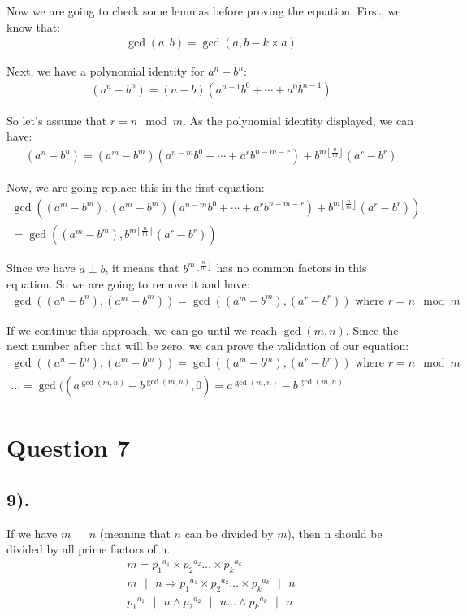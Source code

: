 \documentclass[12pt]{article}
\begin{document}
Now we are going to check some lemmas before proving the equation. First, we know that:
\begin{gather*}
    \gcd(a, b) = \gcd(a, b - k \times a)
\end{gather*}

Next, we have a polynomial identity for $a^n - b^n$:
\begin{gather*}
    (a^n - b^n) = (a - b)(a^{n-1}b^0 + \cdots + a^0b^{n-1})
\end{gather*}

So let's assume that $r = n \mod m$. As the polynomial identity displayed, we can have:
\begin{gather*}
    (a^n - b^n) = (a^m - b^m)(a^{n-m}b^0 + \cdots + a^r b^{n-m-r}) + b^{m \left\lfloor \frac{n}{m} \right\rfloor} (a^r - b^r)
\end{gather*}

Now, we are going replace this in the first equation:
\begin{gather*}
    \gcd((a^m - b^m), (a^m - b^m)(a^{n-m}b^0 + \cdots + a^r b^{n-m-r}) + b^{m \left\lfloor \frac{n}{m} \right\rfloor} (a^r - b^r)) \\
    = \gcd((a^m - b^m), b^{m \left\lfloor \frac{n}{m} \right\rfloor} (a^r - b^r))
\end{gather*}

Since we have $a \perp b$, it means that $b^{m \left\lfloor \frac{n}{m} \right\rfloor}$ has no common factors in this equation.
So we are going to remove it and have:
\begin{gather*}
    \gcd((a^n - b^n), (a^m - b^m)) = \gcd((a^m - b^m), (a^r - b^r)) \text{ where $r = n \mod m$}
\end{gather*}

If we continue this approach, we can go until we reach $\gcd(m,n)$. Since the next number after that will
be zero, we can prove the validation of our equation:
\begin{gather*}
    \gcd((a^n - b^n), (a^m - b^m)) = \gcd((a^m - b^m), (a^r - b^r)) \text{ where $r = n \mod m$} \\
    \ldots
    = \gcd((a^{\gcd(m,n)} - b^{\gcd(m,n)}, 0) = a^{\gcd(m,n)} - b^{\gcd(m,n)}
\end{gather*}

\section*{Question 7}
\subsection*{9).}
If we have $m\text{ $|$ }n$ (meaning that $n$ can be divided by $m$), then n should be divided by all prime factors of n.
\begin{gather*}
    m = {p_{1}}^{a_{1}} \times {p_{2}}^{a_{2}} \ldots \times {p_{k}}^{a_{k}} \\
    m \text{ $|$ } n \Rightarrow {p_{1}}^{a_{1}} \times {p_{2}}^{a_{2}} \ldots \times {p_{k}}^{a_{k}} \text{ $|$ } n \\
    {p_{1}}^{a_{1}} \text{ $|$ } n \wedge {p_{2}}^{a_{2}} \text{ $|$ } n \ldots \wedge {p_{k}}^{a_{k}} \text{ $|$ } n
\end{gather*}
\end{document}
